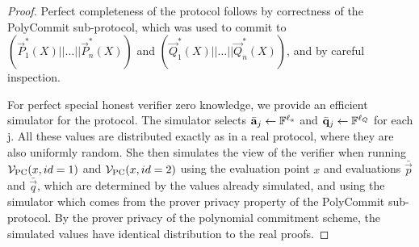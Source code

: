 \begin{proof}
Perfect completeness of the protocol follows by correctness of the PolyCommit sub-protocol, which was used to commit to $\left( \vec{P}_1^*(X)||\ldots||\vec{P}_n^*(X)\right)$ and $\left( \vec{Q}_1^*(X)||\ldots||\vec{Q}_n^*(X)\right)$, and by careful inspection.

For perfect special honest verifier zero knowledge, we provide an efficient simulator for the protocol. The simulator selects $\bar{\mathbf{a}}_j \gets \mathbb{F}^{\ell_a}$ and $\bar{\mathbf{q}}_j\gets \mathbb{F}^{\ell_Q}$ for each j. All these values are distributed exactly as in a real protocol, where they are also uniformly random. She then simulates the view of the verifier when running $\mathcal{V}_\mathrm{PC}(x,id=1)$ and $\mathcal{V}_\mathrm{PC}(x,id=2)$ using the evaluation point $x$ and evaluations $\bar{\vec{p}}$ and $\bar{\vec{q}}$, which are determined by the values already simulated, and using the simulator which comes from the prover privacy property of the PolyCommit sub-protocol. By the prover privacy of the polynomial commitment scheme, the simulated values have identical distribution to the real proofs.


\end{proof}
